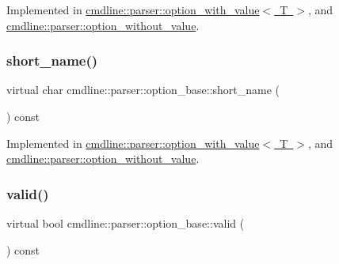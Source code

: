 Implemented in \mbox{\hyperlink{classcmdline_1_1parser_1_1option__with__value_a7ea043466b20ee712439276b8ba888f3}{cmdline\+::parser\+::option\+\_\+with\+\_\+value$<$ T $>$}}, and \mbox{\hyperlink{classcmdline_1_1parser_1_1option__without__value_a094839df784a0f6a5044ec42d682f845}{cmdline\+::parser\+::option\+\_\+without\+\_\+value}}.

\mbox{\label{classcmdline_1_1parser_1_1option__base_aeea790198b8097ccb98a5a9063d3c81f}} 
\subsubsection{\texorpdfstring{short\_name()}{short\_name()}}
{\footnotesize\ttfamily virtual char cmdline\+::parser\+::option\+\_\+base\+::short\+\_\+name (\begin{DoxyParamCaption}{ }\end{DoxyParamCaption}) const\hspace{0.3cm}{\ttfamily [pure virtual]}}



Implemented in \mbox{\hyperlink{classcmdline_1_1parser_1_1option__with__value_a2ebacba0864e4473cefc8a4a967f4ab1}{cmdline\+::parser\+::option\+\_\+with\+\_\+value$<$ T $>$}}, and \mbox{\hyperlink{classcmdline_1_1parser_1_1option__without__value_a6a4f9070fc44c46584515ad0a72a75af}{cmdline\+::parser\+::option\+\_\+without\+\_\+value}}.

\mbox{\label{classcmdline_1_1parser_1_1option__base_ae0f802a846608195166bc5ad925462e2}} 
\subsubsection{\texorpdfstring{valid()}{valid()}}
{\footnotesize\ttfamily virtual bool cmdline\+::parser\+::option\+\_\+base\+::valid (\begin{DoxyParamCaption}{ }\end{DoxyParamCaption}) const\hspace{0.3cm}{\ttfamily [pure virtual]}}



